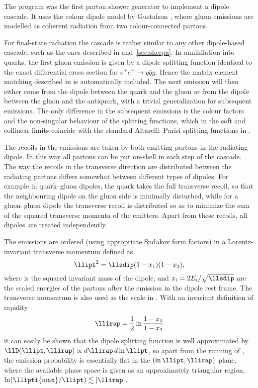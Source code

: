 %

The \Ariadne program \cite{Lonnblad:1992tz} was the first parton
shower generator to implement a dipole cascade. It uses the colour
dipole model by Gustafson \lletal
\cite{Gustafson:1986db,Gustafson:1987rq,Andersson:1988gp}, where gluon
emissions are modelled as coherent radiation from two colour-connected
partons.

For final-state radiation the \Ariadne cascade is rather similar to
any other dipole-based cascade, such as the ones described in
 and~\ref{sec:sherpa}. In \llee annihilation
into quarks, the first gluon emission is given by a dipole splitting
function identical to the exact differential cross section for
$e^+e^-\to q\bar{q}g$. Hence the matrix element matching
  described in  is automatically
  included.  The next emission will then either come from the dipole
between the quark and the gluon or from the dipole between the gluon
and the antiquark, with a trivial generalization for subsequent
emissions. The only difference in the subsequent emissions is the
colour factors and the non-singular behaviour of the splitting
functions, which in the soft and collinear limits coincide with the
standard Altarelli--Parisi splitting functions in .

The recoils in the emissions are taken by both emitting partons in the
radiating dipole. In this way all partons can be put on-shell in each
step of the cascade. The way the recoils in the transverse direction
are distributed between the radiating partons differs somewhat between
different types of dipoles. For example in quark--gluon dipoles, the quark
takes the full transverse recoil, so that the neighbouring dipole on
the gluon side is minimally disturbed, while for a gluon--gluon dipole
the transverse recoil is distributed so as to minimize the sum of the
squared transverse momenta of the emitters. Apart from these recoils,
all dipoles are treated independently.

The emissions are ordered (using appropriate Sudakov form factors) in
a Lorentz-invariant transverse momentum defined as
\begin{equation}
  \label{eq:ariadne-pt}
  \llipt^2=\llsdip(1-x_1)(1-x_2),
\end{equation}
where \llsdip is the squared invariant mass of the dipole, and
$x_i=2E_i/\sqrt{\llsdip}$ are the scaled energies of the partons after
the emission in the dipole rest frame. The transverse momentum is also
used as the scale in \alphaS. With an invariant definition of rapidity
\begin{equation}
  \label{eq:ariadne-y}
  \llirap=\frac{1}{2}\ln\frac{1-x_1}{1-x_2}
\end{equation}
it can easily be shown that the dipole splitting function is well
approximated by $\llD(\llipt,\llirap)\propto d\llirap\, d\ln\llipt$,
so apart from the running of \alphaS, the emission probability is
essentially flat in the $(\ln\llipt,\llirap)$ plane, where the
available phase space is given as an approximately triangular region,
$\ln(\llipti{\max}/\llipt)\lesssim|\llirap|$.

